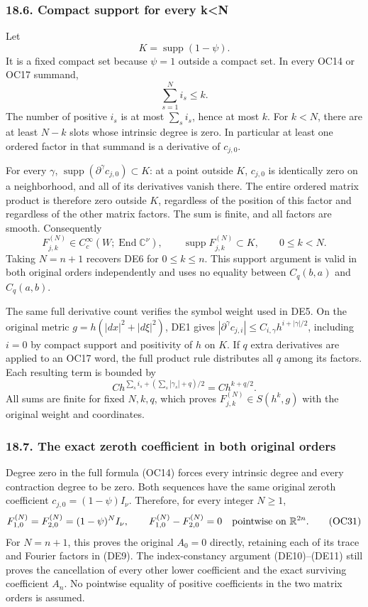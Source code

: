 \documentclass[
  11pt,
]{article}
\begin{document}
\subsubsection{18.6. Compact support for every
k\textless N}\label{compact-support-for-every-kn}

Let \[
K=\operatorname{supp}(1-\psi).
\tag{OC27}
\] It is a fixed compact set because \(\psi=1\) outside a compact set.
In every OC14 or OC17 summand, \[
\sum_{s=1}^{N}i_s\le k.
\tag{OC28}
\] The number of positive \(i_s\) is at most \(\sum_s i_s\), hence at
most \(k\). For \(k<N\), there are at least \(N-k\) slots whose
intrinsic degree is zero. In particular at least one ordered factor in
that summand is a derivative of \(c_{j,0}\).

For every \(\gamma\),
\(\operatorname{supp}(\partial^\gamma c_{j,0})\subset K\): at a point
outside \(K\), \(c_{j,0}\) is identically zero on a neighborhood, and
all of its derivatives vanish there. The entire ordered matrix product
is therefore zero outside \(K\), regardless of the position of this
factor and regardless of the other matrix factors. The sum is finite,
and all factors are smooth. Consequently \[
\boxed{F_{j,k}^{(N)}\in C_c^\infty
 (W;\operatorname{End}\mathbb C^\nu),\qquad
 \operatorname{supp}F_{j,k}^{(N)}\subset K,
 \qquad 0\le k<N.}
\tag{OC29}
\] Taking \(N=n+1\) recovers DE6 for \(0\le k\le n\). This support
argument is valid in both original orders independently and uses no
equality between \(C_q(b,a)\) and \(C_q(a,b)\).

The same full derivative count verifies the symbol weight used in DE5.
On the original metric \(g=h(|dx|^2+|d\xi|^2)\), DE1 gives
\(|\partial^\gamma c_{j,i}|\le C_{i,\gamma}h^{i+|\gamma|/2}\), including
\(i=0\) by compact support and positivity of \(h\) on \(K\). If \(q\)
extra derivatives are applied to an OC17 word, the full product rule
distributes all \(q\) among its factors. Each resulting term is bounded
by \[
C h^{\sum_s i_s+(\sum_s|\gamma_s|+q)/2}
=C h^{k+q/2}.
\tag{OC30}
\] All sums are finite for fixed \(N,k,q\), which proves
\(F_{j,k}^{(N)}\in S(h^k,g)\) with the original weight and coordinates.

\subsubsection{18.7. The exact zeroth coefficient in both original
orders}\label{the-exact-zeroth-coefficient-in-both-original-orders}

Degree zero in the full formula (OC14) forces every intrinsic degree and
every contraction degree to be zero. Both sequences have the same
original zeroth coefficient \(c_{j,0}=(1-\psi)I_\nu\). Therefore, for
every integer \(N\geq1\), \[
 F_{1,0}^{(N)}=F_{2,0}^{(N)}=(1-\psi)^N I_\nu,
 \qquad F_{1,0}^{(N)}-F_{2,0}^{(N)}=0
                      \quad\hbox{pointwise on }\mathbb R^{2n}.
 \tag{OC31}
\] For \(N=n+1\), this proves the original \(A_0=0\) directly, retaining
each of its trace and Fourier factors in (DE9). The index-constancy
argument (DE10)--(DE11) still proves the cancellation of every other
lower coefficient and the exact surviving coefficient \(A_n\). No
pointwise equality of positive coefficients in the two matrix orders is
assumed.
\end{document}
